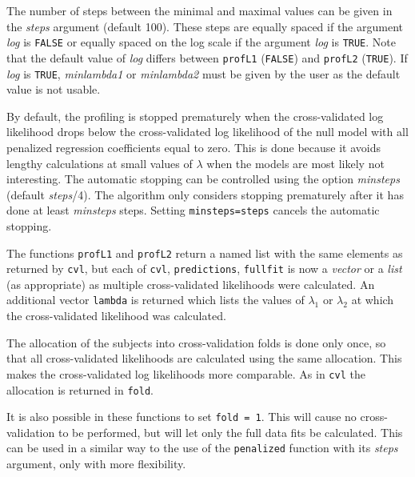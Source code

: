 \documentclass[a4paper]{article}
\newcommand{\Robject}[1]{{\texttt{#1}}}
\newcommand{\Rfunction}[1]{{\texttt{#1}}}
\newcommand{\Rclass}[1]{{\textit{#1}}}
\newcommand{\Rfunarg}[1]{{\textit{#1}}}
\begin{document}
The number of steps between the minimal and maximal values can be given in the \Rfunarg{steps} argument (default 100). These steps are equally spaced if the argument \Rfunarg{log} is \Robject{FALSE} or equally spaced on the log scale if the argument \Rfunarg{log} is \Robject{TRUE}. Note that the default value of \Rfunarg{log} differs between \Rfunction{profL1} (\Robject{FALSE}) and \Rfunction{profL2} (\Robject{TRUE}). If \Rfunarg{log} is \Robject{TRUE}, \Rfunarg{minlambda1} or \Rfunarg{minlambda2} must be given by the user as the default value is not usable.

By default, the profiling is stopped prematurely when the cross-validated log likelihood drops below the cross-validated log likelihood of the null model with all penalized regression coefficients equal to zero. This is done because it avoids lengthy calculations at small values of $\lambda$ when the models are most likely not interesting. The automatic stopping can be controlled using the option \Rfunarg{minsteps} (default \Rfunarg{steps}/4). The algorithm only considers stopping prematurely after it has done at least \Rfunarg{minsteps} steps. Setting \Robject{minsteps=steps} cancels the automatic stopping.

The functions \Rfunction{profL1} and \Rfunction{profL2} return a named list with the same elements as returned by \Rfunction{cvl}, but each of \Robject{cvl}, \Robject{predictions}, \Robject{fullfit} is now a \Rclass{vector} or a \Rclass{list} (as appropriate) as multiple cross-validated likelihoods were calculated. An additional vector \Robject{lambda} is returned which lists the values of $\lambda_1$ or $\lambda_2$ at which the cross-validated likelihood was calculated.

The allocation of the subjects into cross-validation folds is done only once, so that all cross-validated likelihoods are calculated using the same allocation. This makes the cross-validated log likelihoods more comparable. As in \Rfunction{cvl} the allocation is returned in \Robject{fold}.

It is also possible in these functions to set \Robject{fold = 1}. This will cause no cross-validation to be performed, but will let only the full data fits be calculated. This can be used in a similar way to the use of the \Rfunction{penalized} function with its \Rfunarg{steps} argument, only with more flexibility.

\begin{Schunk}
\end{Schunk}
\end{document}

